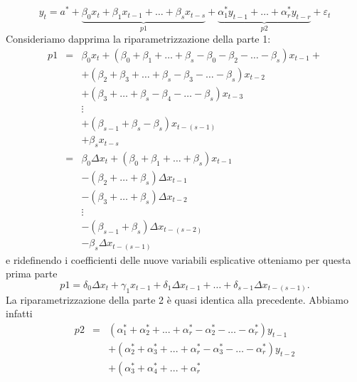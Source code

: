 \documentclass[a4paper]{report}
\newcounter{def}
\theoremstyle{remark}
\begin{document}
\begin{itemize}
\begin{equation*}
y_{t}=a^{\ast }+\underset{p1}{\underbrace{\beta _{0}x_{t}+\beta
_{1}x_{t-1}+\ldots +\beta _{s}x_{t-s}}}+\underset{p2}{\underbrace{\alpha
_{1}^{\ast }y_{t-1}+\ldots +\alpha _{r}^{\ast }y_{t-r}}}+\varepsilon _{t}
\end{equation*}%
Consideriamo dapprima la riparametrizzazione della parte 1:%
\begin{eqnarray*}
p1 &=&\beta _{0}x_{t}+\left( \beta _{0}+\beta _{1}+\ldots +\beta _{s}-\beta
_{0}-\beta _{2}-\ldots -\beta _{s}\right) x_{t-1}+ \\
&&+\left( \beta _{2}+\beta _{3}+\ldots +\beta _{s}-\beta _{3}-\ldots -\beta
_{s}\right) x_{t-2} \\
&&+\left( \beta _{3}+\ldots +\beta _{s}-\beta _{4}-\ldots -\beta _{s}\right)
x_{t-3} \\
&&\vdots \\
&&+\left( \beta _{s-1}+\beta _{s}-\beta _{s}\right) x_{t-(s-1)} \\
&&+\beta _{s}x_{t-s} \\
&=&\beta _{0}\Delta x_{t}+\left( \beta _{0}+\beta _{1}+\ldots +\beta
_{s}\right) x_{t-1} \\
&&-\left( \beta _{2}+\ldots +\beta _{s}\right) \Delta x_{t-1} \\
&&-\left( \beta _{3}+\ldots +\beta _{s}\right) \Delta x_{t-2} \\
&&\vdots \\
&&-\left( \beta _{s-1}+\beta _{s}\right) \Delta x_{t-(s-2)} \\
&&-\beta _{s}\Delta x_{t-(s-1)}
\end{eqnarray*}%
e ridefinendo i coefficienti delle nuove variabili esplicative otteniamo per
questa prima parte%
\begin{equation*}
p1=\delta _{0}\Delta x_{t}+\gamma _{1}x_{t-1}+\delta _{1}\Delta
x_{t-1}+\ldots +\delta _{s-1}\Delta x_{t-(s-1)}.
\end{equation*}%
La riparametrizzazione della parte 2 \`{e} quasi identica alla precedente.
Abbiamo infatti%
\begin{eqnarray*}
p2 &=&\left( \alpha _{1}^{\ast }+\alpha _{2}^{\ast }+...+\alpha _{r}^{\ast
}-\alpha _{2}^{\ast }-\ldots -\alpha _{r}^{\ast }\right) y_{t-1} \\
&&+\left( \alpha _{2}^{\ast }+\alpha _{3}^{\ast }+...+\alpha _{r}^{\ast
}-\alpha _{3}^{\ast }-\ldots -\alpha _{r}^{\ast }\right) y_{t-2} \\
&&+\left( \alpha _{3}^{\ast }+\alpha _{4}^{\ast }+...+\alpha _{r}^{\ast
}
\end{eqnarray*}
\end{itemize}
\end{document}
